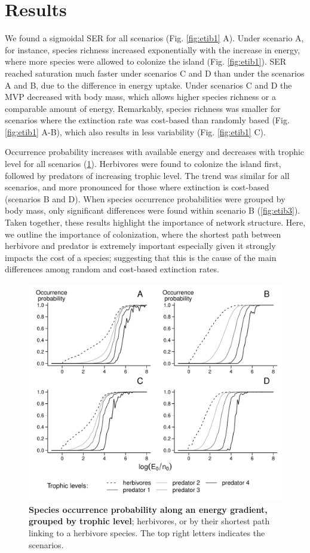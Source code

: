 \section{Results}\label{results}

We found a sigmoidal SER for all scenarios (Fig. \ref{fig:etib1} A).
Under scenario A, for instance, species richness increased exponentially
with the increase in energy, where more species were allowed to colonize
the island (Fig. \ref{fig:etib1}). SER reached saturation much faster
under scenarios C and D than under the scenarios A and B, due to the
difference in energy uptake. Under scenarios C and D the MVP decreased
with body mass, which allows higher species richness or a comparable
amount of energy. Remarkably, species richness was smaller for scenarios
where the extinction rate was cost-based than randomly based (Fig.
\ref{fig:etib1} A-B), which also results in less variability (Fig.
\ref{fig:etib1} C).

Occurrence probability increases with available energy and decreases
with trophic level for all scenarios (\ref{fig:etib2}). Herbivores were
found to colonize the island first, followed by predators of increasing
trophic level. The trend was similar for all scenarios, and more
pronounced for those where extinction is cost-based (scenarios B and D).
When species occurrence probabilities were grouped by body mass, only
significant differences were found within scenario B (\ref{fig:etib3}).
Taken together, these results highlight the importance of network
structure. Here, we outline the importance of colonization, where the
shortest path between herbivore and predator is extremely important
especially given it strongly impacts the cost of a species; suggesting
that this is the cause of the main differences among random and
cost-based extinction rates.

\begin{figure}[htbp]
\centering
\includegraphics{fig/fig2.pdf}
\caption{\textbf{Species occurrence probability along an energy
gradient, grouped by trophic level}; herbivores, or by their shortest
path linking to a herbivore species. The top right letters indicates the
scenarios.\label{fig:etib2}}
\end{figure}

